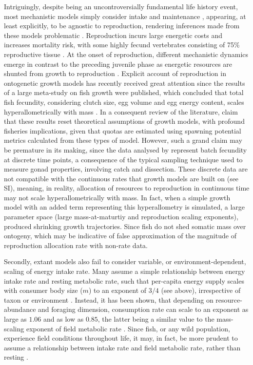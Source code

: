 \documentclass[a4paper]{article} %
\begin{document}
    Intriguingly, despite being an uncontroversially fundamental life history event, most mechanistic models simply consider intake and maintenance \autocite{Marshall2019b}, appearing, at least explicitly, to be agnostic to reproduction, rendering inferences made from these models problematic \autocite{Day1997, Marshall2019b}. Reproduction incurs large energetic costs and increases mortality risk, with some highly fecund vertebrates consisting of 75\% reproductive tissue \autocite{Parker2018}. At the onset of reproduction, different mechanistic dynamics emerge in contrast to the preceding juvenile phase as energetic resources are shunted from growth to reproduction \autocite{Day1997}. Explicit account of reproduction in ontogenetic growth models has recently received great attention since the results of a large meta-study on fish growth were published, which concluded that total fish fecundity, considering clutch size, egg volume and egg energy content, scales hyperallometrically with mass \autocite{Barneche2018d}. In a consequent review of the literature, \cite{Marshall2019b} claim that these results reset theoretical assumptions of growth models, with profound fisheries implications, given that quotas are estimated using spawning potential metrics calculated from these types of model. However, such a grand claim may be premature in its making, since the data analysed by \cite{Barneche2018d} represent batch fecundity at discrete time points, a consequence of the typical sampling technique used to measure gonad properties, involving catch and dissection. These discrete data are not compatible with the continuous rates that growth models are built on (see SI), meaning, in reality, allocation of resources to reproduction in continuous time may not scale hyperallometrically with mass. In fact, when a simple growth model with an added term representing this hyperallometry is simulated, a large parameter space (large mass-at-maturtiy and reproduction scaling exponents), produced shrinking growth trajectories. Since fish do not shed somatic mass over ontogeny, which may be indicative of false approximation of the magnitude of reproduction allocation rate with non-rate data.
    
    Secondly, extant models also fail to consider variable, or environment-dependent, scaling of energy intake rate. Many assume a simple relationship between energy intake rate and resting metabolic rate, such that per-capita energy supply scales with consumer body size ($m$) to an exponent of $3/4$ (see above), irrespective of taxon or environment \autocite{Pawar2012}. Instead, it has been shown, that depending on resource-abundance and foraging dimension, consumption rate can scale to an exponent as large as $1.06$ and as low as $0.85$, the latter being a similar value to the mass-scaling exponent of field metabolic rate \autocite{peters1983,Weibel2004, Pawar2012}. Since fish, or any wild population, experience field conditions throughout life, it may, in fact, be more prudent to assume a relationship between intake rate and field metabolic rate, rather than resting \autocite{Boisclair1993}.
    
\end{document}
